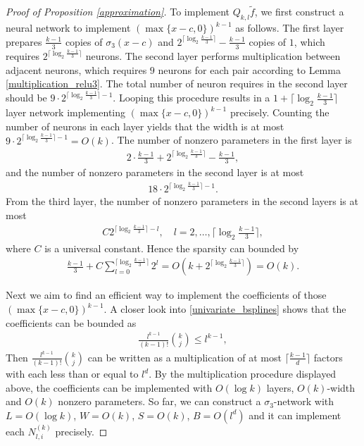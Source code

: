 \documentclass{article}
\theoremstyle{plain}
\theoremstyle{definition}
\theoremstyle{remark}
\begin{document}
\begin{proof}[Proof of Proposition \ref{approximation}]
    To implement $Q_{k,l} \tilde{f}$, we first construct a neural network to implement $(\max\{x - c, 0\})^{k-1}$ as follows. The first layer prepares $\frac{k-1}{3}$ copies of $\sigma_3(x-c)$ and $2^{\lceil \log_2  \frac{k-1}{3}\rceil} - \frac{k-1}{3}$ copies of $1$, which requires $2^{\lceil \log_2  \frac{k-1}{3}\rceil}$ neurons. The second layer performs multiplication between adjacent neurons, which requires $9$ neurons for each pair according to Lemma \ref{multiplication_relu3}. The total number of neuron requires in the second layer should be $9 \cdot 2^{\lceil \log_2  \frac{k-1}{3}\rceil - 1}$. Looping this procedure results in a $1 + \lceil \log_2  \frac{k-1}{3}\rceil$ layer network implementing $(\max\{x-c, 0\})^{k-1}$ precisely. Counting the number of neurons in each layer yields that the width is at most $9 \cdot 2^{\lceil \log_2  \frac{k-1}{3}\rceil - 1} = O(k)$. The number of nonzero parameters in the first layer is
        \begin{align*}
            2 \cdot \frac{k-1}{3} + 2^{\lceil \log_2  \frac{k-1}{3}\rceil} - \frac{k-1}{3},
        \end{align*}
        and the number of nonzero parameters in the second layer is at most  
        \begin{align*}
            18 \cdot 2^{\lceil \log_2  \frac{k-1}{3}\rceil-1}.
        \end{align*}
        From the third layer, the number of nonzero parameters in the second layers is at most 
        \begin{align*}
            C 2^{\lceil \log_2  \frac{k-1}{3}\rceil-l}, \quad l = 2, \ldots, {\lceil \log_2  \frac{k-1}{3}\rceil},
        \end{align*}
        where $C$ is a universal constant. 
        Hence the sparsity can bounded by
        \begin{align*}
            \frac{k-1}{3} + C \sum_{l=0}^{{\lceil \log_2  \frac{k-1}{3}\rceil}} 2^l = O(k + 2^{{\lceil \log_2  \frac{k-1}{3}\rceil}}) = O(k). 
        \end{align*}

    Next we aim to find an efficient way to implement the coefficients of those $(\max\{x-c, 0\})^{k-1}$. A closer look into \eqref{univariate_bsplines} shows that the coefficients can be bounded as 
    \begin{align*}
        \frac{l^{k-1}}{(k-1)!} \binom{k}{j} \leq l^{k-1}, 
    \end{align*}
    Then $\frac{l^{k-1}}{(k-1)!} \binom{k}{j}$ can be written as a multiplication of at most $\lceil \frac{k-1}{d} \rceil$ factors with each less than or equal to $l^d$. By the multiplication procedure displayed above, the coefficients can be implemented with $O(\log k)$ layers, $O(k)$-width and $O(k)$ nonzero parameters. So far, we can construct a $\sigma_3$-network with $L = O(\log k)$, $W = O(k)$, $S = O(k)$, $B = O(l^d)$ and it can implement each $N_{l, i}^{(k)}$ precisely. 


\end{proof}
\end{document}
